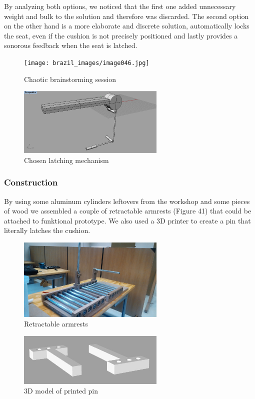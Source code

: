By analyzing both options, we noticed that the first one added unnecessary weight and bulk to the solution and therefore was discarded. The second option on the other hand is a more elaborate and discrete solution, automatically locks the seat, even if the cushion is not precisely positioned and lastly provides a sonorous feedback when the seat is latched. \\

\begin{figure}[h]
\centering
\texttt{[image: brazil\_images/image046.jpg]}
\caption{Chaotic brainstorming session}
\label{fig:chaotic_brainstorming}
\end{figure}


\begin{figure}[h]
\centering
\includegraphics[width=7cm]{brazil_images/image048.png}
\caption{Chosen latching mechanism}
\label{fig:latching}
\end{figure}


\subsubsection{Construction}
By using some aluminum cylinders leftovers from the workshop and some pieces of wood we assembled a couple of retractable armrests (Figure 41) that could be attached to funktional prototype. We also used a 3D printer to create a pin that literally latches the cushion.

\begin{figure}[h]
\centering
\includegraphics[width=7cm]{brazil_images/image049.jpg}
\caption{Retractable armrests}
\label{fig:retractable_armrest}
\end{figure}


\begin{figure}[h]
\centering
\includegraphics[width=7cm]{brazil_images/image050.png}
\caption{3D model of printed pin}
\label{fig:model_printed_pin}
\end{figure}

